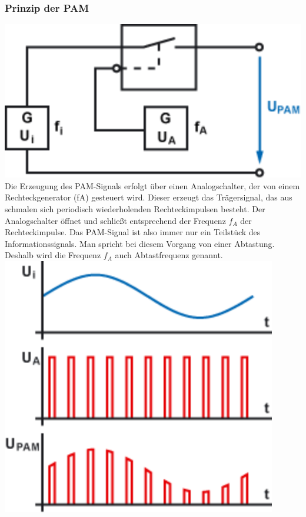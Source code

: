 \documentclass[a4paper,10pt]{article}
\begin{document}
\subsubsection{Prinzip der PAM}
\includegraphics[scale=0.5]{PAM.png}\\
Die Erzeugung des PAM-Signals erfolgt über einen Analogschalter, der von einem Rechteckgenerator (fA) gesteuert wird. Dieser erzeugt das Trägersignal,
das aus schmalen sich periodisch wiederholenden Rechteckimpulsen besteht. Der Analogschalter öffnet und schließt entsprechend der Frequenz $f_A$ der Rechteckimpulse. 
Das PAM-Signal ist also immer nur ein Teilstück des Informationssignals. Man spricht bei diesem Vorgang von einer Abtastung. Deshalb wird die Frequenz $f_A$ auch Abtastfrequenz genannt.\\
\includegraphics[scale=0.5]{PAM2.png}\\
\end{document}

